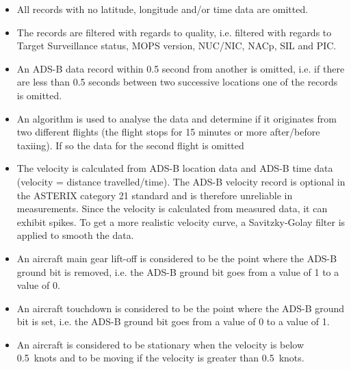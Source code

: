 \begin{itemize}
    \item All records with no latitude, longitude and/or time data are omitted.
    \item The records are filtered with regards to quality, i.e. filtered with regards to Target Surveillance status, MOPS version, NUC/NIC, NACp, SIL and PIC.
    \item An ADS-B data record within 0.5 second from another is omitted, i.e. if there are less than 0.5 seconds between two successive locations one of the records is omitted.
    \item An algorithm is used to analyse the data and determine if it originates from two different flights (the flight stops for 15 minutes or more after/before taxiing). If so the data for the second flight is omitted
    \item The velocity is calculated from ADS-B location data and ADS-B time data (velocity = distance travelled/time). The ADS-B velocity record is optional in the ASTERIX category 21 standard and is therefore unreliable in measurements. Since the velocity is calculated from measured data, it can exhibit spikes. To get a more realistic velocity curve, a Savitzky-Golay filter is applied to smooth the data.
    \item An aircraft main gear lift-off is considered to be the point where the ADS-B ground bit is removed, i.e. the ADS-B ground bit goes from a value of 1 to a value of 0.
    \item An aircraft touchdown is considered to be the point where the ADS-B ground bit is set, i.e. the ADS-B ground bit goes from a value of 0 to a value of 1.
    \item An aircraft is considered to be stationary when the velocity is below 0.5~knots and to be moving if the velocity is greater than 0.5~knots.
    
\end{itemize}


